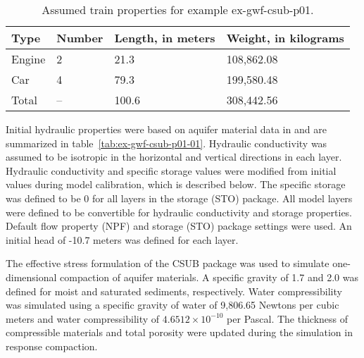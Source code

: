 \small
\begin{longtable}[!htbp]{
                                      p{}
                                      p{}
                                      p{}
                                      p{}
                                      }
	\caption{Assumed train properties for example ex-gwf-csub-p01.} \label{tab:ex-gwf-csub-p01-train} \\

	\hline \hline
	\rowcolor{Gray}
	\textbf{Type} & \textbf{Number} & \textbf{Length, in meters} & \textbf{Weight, in kilograms}  \\
	\hline
	\endhead
	
	Engine & 2 &  21.3 &   108,862.08 \\
	Car      & 4 &    79.3 &   199,580.48 \\ 
	\hline
	Total     & -- & 100.6 &   308,442.56 \\ 
	\hline \hline
\end{longtable}
\normalsize

Initial hydraulic properties were based on aquifer material data in \cite{freeze1979groundwater} and are summarized in table~\ref{tab:ex-gwf-csub-p01-01}. Hydraulic conductivity was assumed to be isotropic in the horizontal and vertical directions in each layer. Hydraulic conductivity and specific storage values were modified from initial values during model calibration, which is described below. The specific storage was defined to be 0 for all layers in the storage (STO) package. All model layers were defined to be convertible for hydraulic conductivity and storage properties. Default flow property (NPF) and storage (STO) package settings were used. An initial head of -10.7 meters was defined for each layer.



The effective stress formulation of the CSUB package was used to simulate one-dimensional compaction of aquifer materials. A specific gravity of 1.7 and 2.0 was defined for moist and saturated sediments, respectively. Water compressibility was simulated using a specific gravity of water of 9,806.65 Newtons per cubic meters and water compressibility of $4.6512 \times 10^{-10}$ per Pascal. The thickness of compressible materials and total porosity were updated during the simulation in response compaction.

